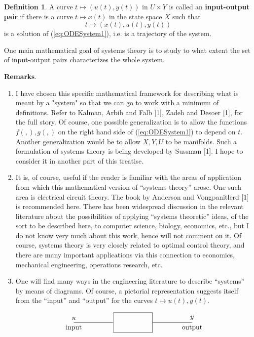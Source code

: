 \documentclass[12pt]{book}
\theoremstyle{plain}
\theoremstyle{definition}
\newtheorem{definition}{Definition}[section]
\begin{document}
\begin{definition}
    A curve $t \mapsto (u(t), y(t))$ in $U \times Y$ is called an \textbf{input-output pair} if there is a curve $t \mapsto x(t)$ in the state space $X$ such that
    $$t \mapsto (x(t), u(t), y(t))$$
    is a solution of (\ref{eq:ODESystem1}), i.e. is a trajectory of the system.
\end{definition}

One main mathematical goal of systems theory is to study to what extent the set of input-output pairs characterizes the whole system.

\textbf{Remarks}.
\begin{enumerate}
    \item I have chosen this specific mathematical framework for describing what is meant by a "system" so that we can go to work with a minimum of definitions.
    Refer to Kalman, Arbib and Falb [1], Zadeh and Desoer [1], for the full story. %
    Of course, one possible generalization is to allow the functions $f( , ), g( , )$ on the right hand side of (\ref{eq:ODESystem1}) to depend on $t$.
    Another generalization would be to allow $X, Y, U$ to be manifolds.
    Such a formulation of systems theory is being developed by Sussman [1]. %
    I hope to consider it in another part of this treatise.
    \item It is, of course, useful if the reader is familiar with the areas of application from which this mathematical version of ``systems theory'' arose.
    One such area is electrical circuit theory.
    The book by Anderson and Vongpanitlerd [1] is recommended here. %
    There has been widespread discussion in the relevant literature about the possibilities of applying ``systems theoretic'' ideas, of the sort to be described here, to computer science, biology, economics, etc., but I do not know very much about this work, hence will not comment on it.
    Of course, systems theory is very closely related to optimal control theory, and there are many important applications via this connection to economics, mechanical engineering, operations research, etc.
    \item One will find many ways in the engineering literature to describe ``systems'' by means of diagrams.
    Of course, a pictorial representation suggests itself from the ``input'' and ``output'' for the curves $t \mapsto u(t), y(t)$.

    \begin{equation*}
    \begin{tikzpicture}
        \node[draw, rectangle, minimum width=2cm, minimum height=1cm] (box) at (0,0) {};
        \draw (box.west) -- ++(-2,0) node[above]{$u$} node[below]{input};
        \draw (box.east) -- ++(2,0) node[above]{$y$} node[below]{output};
    \end{tikzpicture}
    \end{equation*}
    

\end{enumerate}
\end{document}
